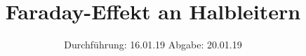 

\subject{V46}
\title{Faraday-Effekt an Halbleitern}
\date{%
  Durchführung: 16.01.19
  \hspace{3em}
  Abgabe: 20.01.19
}



\maketitle
\thispagestyle{empty}
\tableofcontents
\newpage






\printbibliography{}


